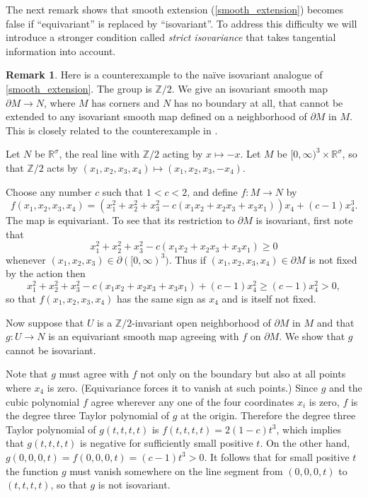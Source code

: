 \documentclass[11pt]{amsart}
\theoremstyle{definition}
\newtheorem{rem}{Remark}[section]
\numberwithin{equation}{section}
\numberwithin{figure}{section}
\newcommand{\R}{\mathbb R}
\newcommand{\Z}{\mathbb Z}
\begin{document}
 The next remark shows that smooth extension (\autoref{smooth_extension}) becomes false if ``equivariant'' is replaced by ``isovariant''. To address this difficulty we will introduce a stronger condition called \emph{strict isovariance} that takes tangential information into account. 
\begin{rem}
	Here is a counterexample to the na\" ive isovariant analogue of \autoref{smooth_extension}. The group is $\mathbb Z/2$. We give an isovariant smooth map $\partial M \to N$, where $M$ has corners and $N$ has no boundary at all, that cannot be extended to any isovariant smooth map defined on a neighborhood of $\partial M$ in $M$. This is closely related to the counterexample in \cite[Rem 2.10]{GIMM1}. 
	
	Let $N$ be $\R^\sigma$, the real line with $\Z/2$ acting by $x\mapsto -x$. Let 
$M$ be $[0,\infty)^3 \times \R^\sigma$, so that $\Z/2$ acts by $(x_1,x_2,x_3,x_4)\mapsto (x_1,x_2,x_3,-x_4)$. 

	Choose any number $c$ such that $1 < c < 2$, and define $f:M\to N$ by
		\[ f(x_1,x_2,x_3,x_4) = (x_1^2 + x_2^2 + x_3^2 - c(x_1x_2 + x_2x_3 + x_3x_1))x_4 + (c-1)x_4^3. \]
	The map is equivariant. To see that its restriction to $\partial M$ is isovariant, first note that
	$$
	x_1^2 + x_2^2 + x_3^2 - c(x_1x_2 + x_2x_3 + x_3x_1)\ge 0
	$$
	whenever $(x_1,x_2,x_3)\in \partial ([0,\infty)^3)$. Thus if $(x_1,x_2,x_3,x_4)\in \partial M$ is not fixed by the action then 
	$$
	x_1^2 + x_2^2 + x_3^2 - c(x_1x_2 + x_2x_3 + x_3x_1)+(c-1)x_4^2\ge (c-1)x_4^2 > 0,
	$$
so that $f(x_1,x_2,x_3,x_4)$ has the same sign as $x_4$ and is itself not fixed.
	
	Now suppose that $U$ is a $\mathbb Z/2$-invariant open neighborhood of $\partial M$ in $M$ and that $g:U\to N$ is an equivariant smooth map agreeing with $f$ on $\partial M$. We show that $g$ cannot be isovariant.
	
	Note that $g$ must agree with $f$ not only on the boundary but also at all points where $x_4$ is zero. (Equivariance forces it to vanish at such points.) Since $g$ and the cubic polynomial $f$ agree wherever any one of the four coordinates $x_i$ is zero, $f$ is the degree three Taylor polynomial of $g$ at the origin. Therefore the degree three Taylor polynomial of $g(t,t,t,t)$ is $f(t,t,t,t)=2(1-c)t^3$, which implies that $g(t,t,t,t)$ is negative for sufficiently small positive $t$. On the other hand, $g(0,0,0,t)=f(0,0,0,t)=(c-1)t^3 > 0$. It follows that for small positive $t$ the function $g$ must vanish somewhere on the line segment from $(0,0,0,t)$ to $(t,t,t,t)$, so that $g$ is not isovariant.
\end{rem}
\end{document}
